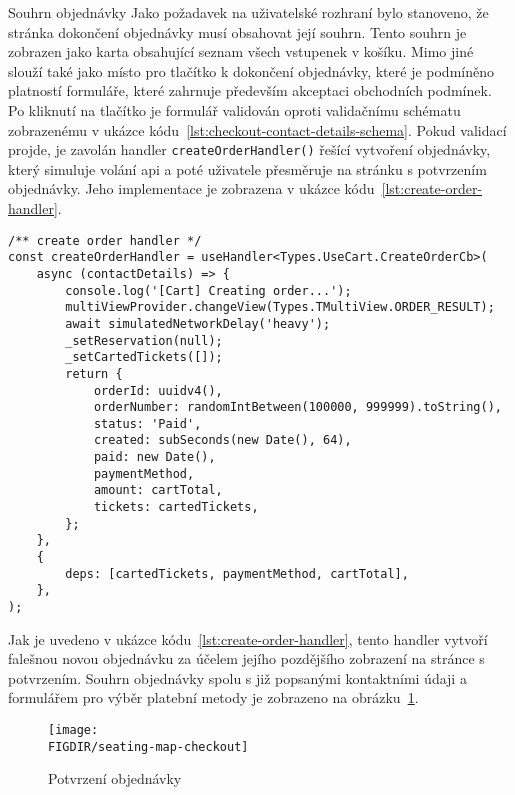 \begin{subsection}{Souhrn objednávky}
    \label{subsec:implementace-checkout-souhrn}
    Jako požadavek na uživatelské rozhraní bylo stanoveno, že stránka dokončení objednávky musí obsahovat její souhrn.
    Tento souhrn je zobrazen jako karta obsahující seznam všech vstupenek v košíku.
    Mimo jiné slouží také jako místo pro tlačítko k dokončení objednávky, které je podmíněno platností formuláře, které zahrnuje především akceptaci obchodních podmínek.
    Po kliknutí na tlačítko je formulář validován oproti validačnímu schématu zobrazenému v ukázce kódu~\ref{lst:checkout-contact-details-schema}.
    Pokud validací projde, je zavolán handler \texttt{createOrderHandler()} řešící vytvoření objednávky, který simuluje volání \ac{api} a poté uživatele přesměruje na stránku s potvrzením objednávky.
    Jeho implementace je zobrazena v ukázce kódu~\ref{lst:create-order-handler}.

    \begin{listing}[H]
        \begin{verbatim}
/** create order handler */
const createOrderHandler = useHandler<Types.UseCart.CreateOrderCb>(
	async (contactDetails) => {
		console.log('[Cart] Creating order...');
		multiViewProvider.changeView(Types.TMultiView.ORDER_RESULT);
		await simulatedNetworkDelay('heavy');
		_setReservation(null);
		_setCartedTickets([]);
		return {
			orderId: uuidv4(),
			orderNumber: randomIntBetween(100000, 999999).toString(),
			status: 'Paid',
			created: subSeconds(new Date(), 64),
			paid: new Date(),
			paymentMethod,
			amount: cartTotal,
			tickets: cartedTickets,
		};
	},
	{
		deps: [cartedTickets, paymentMethod, cartTotal],
	},
);
        \end{verbatim}
        \caption{Implementace handleru pro vytvoření objednávky}
        \label{lst:create-order-handler}
    \end{listing}

    Jak je uvedeno v ukázce kódu~\ref{lst:create-order-handler}, tento handler vytvoří falešnou novou objednávku za účelem jejího pozdějšího zobrazení na stránce s potvrzením.
    Souhrn objednávky spolu s již popsanými kontaktními údaji a formulářem pro výběr platební metody je zobrazeno na obrázku~\ref{fig:seating-map-checkout}.

    \begin{figure}[H]
        \centering
        \caption{Potvrzení objednávky}
        \texttt{[image: \\FIGDIR/seating-map-checkout]}
        \source{}
        \label{fig:seating-map-checkout}
    \end{figure}
\end{subsection}
\pagebreak

